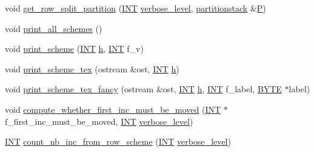 \begin{DoxyCompactItemize}
\item 
void \mbox{\hyperlink{classtdo__scheme_ad12273edf8ebfd4141d2c30c59d4048f}{get\+\_\+row\+\_\+split\+\_\+partition}} (\mbox{\hyperlink{galois_8h_a09fddde158a3a20bd2dcadb609de11dc}{I\+NT}} \mbox{\hyperlink{simeon_8_c_a818073fbcc2f439e7c56952f67386122}{verbose\+\_\+level}}, \mbox{\hyperlink{classpartitionstack}{partitionstack}} \&\mbox{\hyperlink{classtdo__scheme_ac9beab3ff56b5145a9b141f3b1bf75d0}{P}})
\item 
void \mbox{\hyperlink{classtdo__scheme_af63472d1eeb3ba8f1cca5e37ebe6b769}{print\+\_\+all\+\_\+schemes}} ()
\item 
void \mbox{\hyperlink{classtdo__scheme_af3d21e7abf7ef3b83d9ead5629687634}{print\+\_\+scheme}} (\mbox{\hyperlink{galois_8h_a09fddde158a3a20bd2dcadb609de11dc}{I\+NT}} \mbox{\hyperlink{alphabet2_8_c_a16611451551e3d15916bae723c3f59f7}{h}}, \mbox{\hyperlink{galois_8h_a09fddde158a3a20bd2dcadb609de11dc}{I\+NT}} f\+\_\+v)
\item 
void \mbox{\hyperlink{classtdo__scheme_acc6b6ace372b6d0b108a6fea19ab23d0}{print\+\_\+scheme\+\_\+tex}} (ostream \&ost, \mbox{\hyperlink{galois_8h_a09fddde158a3a20bd2dcadb609de11dc}{I\+NT}} \mbox{\hyperlink{alphabet2_8_c_a16611451551e3d15916bae723c3f59f7}{h}})
\item 
void \mbox{\hyperlink{classtdo__scheme_add35be0786e2fef6a3be453c7acc8345}{print\+\_\+scheme\+\_\+tex\+\_\+fancy}} (ostream \&ost, \mbox{\hyperlink{galois_8h_a09fddde158a3a20bd2dcadb609de11dc}{I\+NT}} \mbox{\hyperlink{alphabet2_8_c_a16611451551e3d15916bae723c3f59f7}{h}}, \mbox{\hyperlink{galois_8h_a09fddde158a3a20bd2dcadb609de11dc}{I\+NT}} f\+\_\+label, \mbox{\hyperlink{galois_8h_ab6cc7b4aeb6ea31aba2b3fbfc83ff5e6}{B\+Y\+TE}} $\ast$label)
\item 
void \mbox{\hyperlink{classtdo__scheme_aca3f66823aee8b4df943eac2cd8800b3}{compute\+\_\+whether\+\_\+first\+\_\+inc\+\_\+must\+\_\+be\+\_\+moved}} (\mbox{\hyperlink{galois_8h_a09fddde158a3a20bd2dcadb609de11dc}{I\+NT}} $\ast$f\+\_\+first\+\_\+inc\+\_\+must\+\_\+be\+\_\+moved, \mbox{\hyperlink{galois_8h_a09fddde158a3a20bd2dcadb609de11dc}{I\+NT}} \mbox{\hyperlink{simeon_8_c_a818073fbcc2f439e7c56952f67386122}{verbose\+\_\+level}})
\item 
\mbox{\hyperlink{galois_8h_a09fddde158a3a20bd2dcadb609de11dc}{I\+NT}} \mbox{\hyperlink{classtdo__scheme_a04eeda9bbded74e3a76a49e9798c11eb}{count\+\_\+nb\+\_\+inc\+\_\+from\+\_\+row\+\_\+scheme}} (\mbox{\hyperlink{galois_8h_a09fddde158a3a20bd2dcadb609de11dc}{I\+NT}} \mbox{\hyperlink{simeon_8_c_a818073fbcc2f439e7c56952f67386122}{verbose\+\_\+level}})

\end{DoxyCompactItemize}
